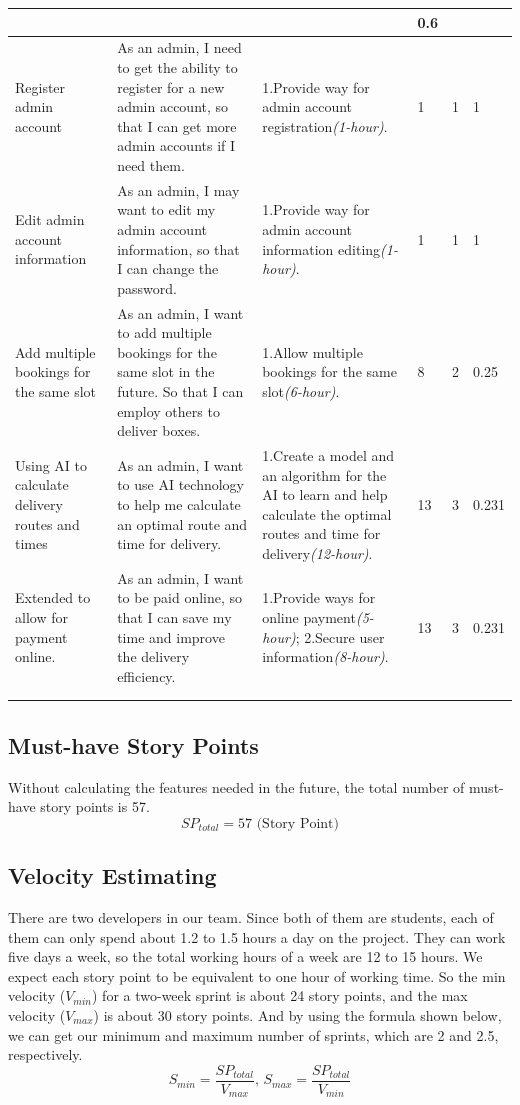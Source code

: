 \documentclass{report}
\begin{document}
\begin{tabularx}{0.95\linewidth}{%
  >{\raggedright\arraybackslash}p{1.5cm}%
  >{\raggedright\arraybackslash}X%
  >{\raggedright\arraybackslash}X%
  p{1cm}p{1cm}p{1cm}
  }
  & 5
  & 3
  & 0.6
  \\
  \midrule
  Register admin account
  & As an admin, I need to get the ability to register for a new admin account, so that I can get more admin accounts if I need them.
  & 1.Provide way for admin account registration\textit{(1-hour)}.
  & 1
  & 1
  & 1
  \\
  \midrule
  Edit admin account information
  & As an admin, I may want to edit my admin account information, so that I can change the password.
  & 1.Provide way for admin account information editing\textit{(1-hour)}.
  & 1
  & 1
  & 1
  \\
  \midrule
  Add multiple bookings for the same slot
  & As an admin, I want to add multiple bookings for the same slot in the future. So that I  can employ others to deliver boxes.
  & 1.Allow multiple bookings for the same slot\textit{(6-hour)}.
  & 8
  & 2
  & 0.25
  \\
  \midrule
  Using AI to calculate delivery routes and times
  & As an admin, I want to use AI technology to help me calculate an optimal route and time for delivery.
  & 1.Create a model and an algorithm for the AI to learn and help calculate the optimal routes and time for delivery\textit{(12-hour)}.
  & 13
  & 3
  & 0.231
  \\
  \midrule
  Extended to allow for payment online.
  & As an admin, I want to be paid online, so that I can save my time and improve the delivery efficiency.
  & 1.Provide ways for online payment\textit{(5-hour)}; 2.Secure user information\textit{(8-hour)}.
  & 13
  & 3
  & 0.231
  \\
  \bottomrule
  \\
  \caption{Product Backlog}  
  \label{tab:productBacklog}
\end{tabularx}  

\subsection{Must-have Story Points}
Without calculating the features needed in the future, the total number of must-have story points is 57.
$$
SP_{total} = 57 \text{ (Story Point)}
$$

\subsection{Velocity Estimating}
There are two developers in our team. Since both of them are students, each of them can only spend about 1.2 to 1.5 hours a day on the project. They can work five days a week, so the total working hours of a week are 12 to 15 hours. We expect each story point to be equivalent to one hour of working time. So the min velocity ($V_{min}$) for a two-week sprint is about 24 story points, and the max velocity ($V_{max}$) is about 30 story points. And by using the formula shown below, we can get our minimum and maximum number of sprints, which are 2 and 2.5, respectively.
$$
S_{min} = \frac{SP_{total}}{V_{max}}
\text{, } 
S_{max} = \frac{SP_{total}}{V_{min}}
$$
\end{document}
